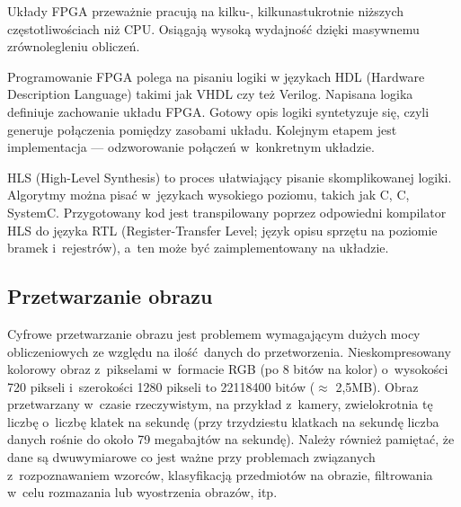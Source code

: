 \documentclass[12pt, oneside, a4paper]{article}
\def\CPP{{C\nolinebreak[4]\hspace{-.05em}\raisebox{.4ex}{\tiny\bf ++}}}
\begin{document}
Układy FPGA przeważnie pracują na kilku-, kilkunastukrotnie niższych
częstotliwościach niż CPU. Osiągają wysoką wydajność
dzięki masywnemu zrównolegleniu obliczeń.

Programowanie FPGA polega na pisaniu logiki
w językach HDL (Hardware Description Language) takimi jak VHDL 
czy też Verilog. Napisana logika definiuje zachowanie układu FPGA.
Gotowy opis logiki syntetyzuje się, czyli generuje połączenia pomiędzy
zasobami układu. Kolejnym etapem jest implementacja --- odzworowanie
połączeń w~konkretnym układzie.
 
HLS (High-Level Synthesis) to proces ułatwiający pisanie skomplikowanej
logiki. Algorytmy można pisać w~językach wysokiego poziomu, takich jak
C, \CPP, SystemC. Przygotowany kod jest transpilowany poprzez odpowiedni
kompilator HLS do języka RTL (Register-Transfer Level; język opisu sprzętu
na poziomie bramek i~rejestrów), a~ten może być zaimplementowany na układzie.

\subsection{Przetwarzanie obrazu}\label{sec:Przetwarzanie obrazu}
Cyfrowe przetwarzanie obrazu jest problemem wymagającym dużych mocy
obliczeniowych ze względu na ilość danych do przetworzenia. Nieskompresowany
kolorowy obraz z~pikselami w~formacie RGB (po 8 bitów na kolor) o~wysokości
720 pikseli i~szerokości 1280 pikseli to 22118400 bitów (\(\approx \) 2,5MB). Obraz
przetwarzany w~czasie rzeczywistym, na przykład z~kamery, zwielokrotnia tę
liczbę o~liczbę klatek na sekundę (przy trzydziestu klatkach na sekundę liczba
danych rośnie do około 79 megabajtów na sekundę). Należy również pamiętać, że
dane są dwuwymiarowe co jest ważne przy problemach związanych z~rozpoznawaniem
wzorców, klasyfikacją przedmiotów na obrazie, filtrowania w~celu rozmazania lub
wyostrzenia obrazów, itp.
\end{document}
